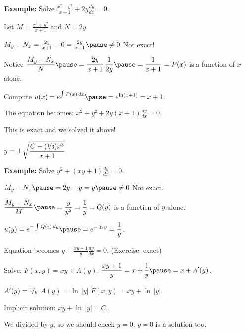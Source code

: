 \documentclass[10pt,aspectratio=169]{beamer}
\begin{document}
\begin{frame}

\textbf{Example:}
Solve \quad
$\displaystyle
\frac{x^2+y^2}{x+1} + 2y \frac{dy}{dx} = 0$.

\medskip
\pause

Let $M= \frac{x^2+y^2}{x+1}$ and $N=2y$.

\medskip
\pause

$M_y-N_x = \frac{2y}{x+1} - 0 = \frac{2y}{x+1} \pause \not= 0$
\pause
\wthus
Not exact!

\medskip
\pause

Notice
\quad
$\displaystyle
\frac{M_y-N_x}{N}
\pause
= \frac{2y}{x+1} \, \frac{1}{2y}
\pause
= \frac{1}{x+1}
= P(x)
$
\quad
is a function of $x$ alone.

\medskip
\pause

Compute \quad
$u(x) = 
e^{\int  P(x) \, dx}
\pause
=
e^{\ln (x+1)} = x+1$.

\medskip
\pause

The equation becomes: \quad
$\displaystyle
x^2+y^2 + 2y(x+1) \frac{dy}{dx} = 0$.

\medskip
\pause

This is exact and we solved it above!

\medskip

$\displaystyle y = \pm \sqrt{\frac{C-(\nicefrac{1}{3})x^3}{x+1}}$
\end{frame}

\begin{frame}
\textbf{Example:}
Solve
$\displaystyle
y^2 + (xy+1) \frac{dy}{dx} = 0$.

\medskip
\pause

$M_y-N_x \pause = 2y-y = y \pause \not= 0$
\wthus
Not exact.

\medskip
\pause

$\displaystyle
\frac{M_y-N_x}{M} \pause = \frac{y}{y^2} = \frac{1}{y} =Q(y)$ 
\quad
is a function of $y$ alone.

\medskip
\pause

$\displaystyle
u(y)
= e^{-\int  Q(y) \, dy}
\pause
=
e^{-\ln y} = \frac{1}{y}$.

\medskip
\pause

Equation becomes
\quad
$\displaystyle y + \frac{xy+1}{y} \frac{dy}{dx} = 0$. \quad (Exercise: exact)

\medskip
\pause

Solve: \quad
$F(x,y) = xy + A(y)$,
\pause
\quad
$\displaystyle
\frac{xy+1}{y} = x+\frac{1}{y} \pause = x+ A'(y)$.

\medskip
\pause

$A'(y) = \nicefrac{1}{y}$
\pause
\wthus
$A(y) = \ln \, \lvert y \rvert$
\pause
\wthus
 $F(x,y) = xy + \ln \, \lvert y \rvert$.

\medskip
\pause

Implicit solution:
$xy + \ln \, \lvert y \rvert = C$.

\medskip
\pause

We divided by $y$, so we should check $y=0$:
\pause
\quad
$y=0$ is a solution too.
\end{frame}
\end{document}
